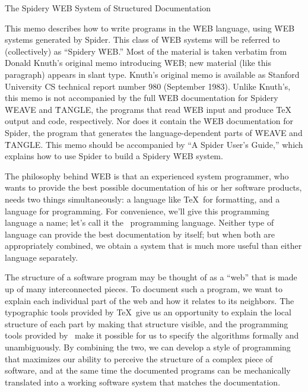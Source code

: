 \centerline{\titlefont The Spidery {\ttitlefont WEB} System
  of Structured Documentation}

\noindent
\newstuff
This memo describes how to write programs in the \.{WEB} language,
using \.{WEB} systems generated by {Spider}.
This class of \.{WEB} systems will be referred to (collectively) as
``Spidery \.{WEB}.''
Most of the material is taken verbatim from Donald Knuth's original
memo introducing \.{WEB}; new material (like this paragraph) appears
in slant type.
Knuth's original memo is available as Stanford University CS technical
 report number 980 (September 1983).
Unlike Knuth's, this memo is not accompanied by the full \.{WEB}
documentation for Spidery \.{WEAVE} and \.{TANGLE}, the programs that
read \.{WEB} input and produce {\TeX} output and code, respectively.
Nor does it contain the \.{WEB} documentation for {Spider}, the program that
 generates the
language-dependent parts of \.{WEAVE} and \.{TANGLE}.
This memo should be accompanied by ``A {Spider} User's Guide,'' which
explains how to use {Spider} to build a Spidery \.{WEB} system.
\endnewstuff

The philosophy behind \.{WEB} is
that an experienced system programmer, who wants to provide the best
possible documentation of his or her software products, needs two things
simultaneously:  a language like \TeX\ for formatting, and a language
for programming.
\newstuff For convenience, we'll give this programming language a
name; let's call it the \PASCAL\ programming language.
\endnewstuff
Neither type of language can provide the best 
documentation by itself; but when both are appropriately combined, we
obtain a system that is much more useful than either language
separately.


The structure of a software program may be thought of as a ``web'' that is
made up of many interconnected pieces.
To document such a program, we want
to explain each individual part of the web and how it relates to its
neighbors.
The typographic tools provided by \TeX\ give us an opportunity
to explain the local structure of each part by making that structure
visible, and the programming tools provided by \PASCAL\ make it possible
for us to specify the algorithms formally and unambiguously.
By combining
the two, we can develop a style of programming that maximizes our ability
to perceive the structure of a complex piece of software, and at the same
time the documented programs can be mechanically translated into a working
software system that matches the documentation.

